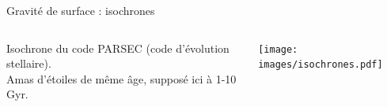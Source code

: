 \documentclass[10pt]{beamer}
\begin{document}
\begin{frame}[fragile]{Gravité de surface : isochrones}
    \begin{columns}
        \begin{column}{0.3\textwidth}
            Isochrone du code PARSEC (code d'évolution stellaire). \\
            \vspace{0.5cm}
            Amas d'étoiles de même âge, supposé ici à 1-10 Gyr. 
        \end{column}
        \begin{column}{0.7\textwidth}
            \begin{center}
                \texttt{[image: images/isochrones.pdf]}
            \end{center}
            
        \end{column}
    \end{columns}
\end{frame}
\end{document}
